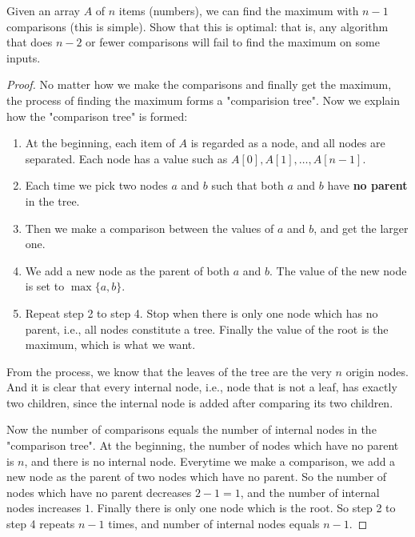 


\maketitle

\begin{thm}{}{}
    Given an array $A$ of $n$ items (numbers), we can find the maximum with $n - 1$ comparisons (this is simple). Show that this is optimal: that is, any algorithm that does $n - 2$ or fewer comparisons will fail to find the maximum on some inputs.
\end{thm}

\begin{proof}
    No matter how we make the comparisons and finally get the maximum, the process of finding the maximum forms a "comparision tree". Now we explain how the "comparison tree" is formed:
    
    \begin{enumerate}
        \item At the beginning, each item of $A$ is regarded as a node, and all nodes are separated. Each node has a value such as $A[0], A[1], \ldots, A[n - 1]$.
        \item Each time we pick two nodes $a$ and $b$ such that both $a$ and $b$ have \textbf{no parent} in the tree.
        \item Then we make a comparison between the values of $a$ and $b$, and get the larger one. 
        \item We add a new node as the parent of both $a$ and $b$. The value of the new node is set to $\max\{a, b\}$.
        \item Repeat step 2 to step 4. Stop when there is only one node which has no parent, i.e., all nodes constitute a tree. Finally the value of the root is the maximum, which is what we want.
    \end{enumerate}
    
    From the process, we know that the leaves of the tree are the very $n$ origin nodes. And it is clear that every internal node, i.e., node that is not a leaf, has exactly two children, since the internal node is added after comparing its two children.
    
    Now the number of comparisons equals the number of internal nodes in the "comparison tree". At the beginning, the number of nodes which have no parent is $n$, and there is no internal node. Everytime we make a comparison, we add a new node as the parent of two nodes which have no parent. So the number of nodes which have no parent decreases $2 - 1 = 1$, and the number of internal nodes increases $1$. Finally there is only one node which is the root. So step 2 to step 4 repeats $n - 1$ times, and number of internal nodes equals $n - 1$.
    

\end{proof}
